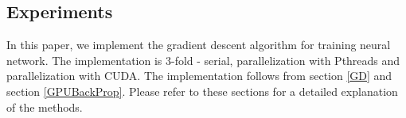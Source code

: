 \subsection{Experiments}
\label{sub:exp}
In this paper, we implement the gradient descent algorithm for training neural network. The implementation is 3-fold - serial, parallelization with Pthreads and parallelization with CUDA. The implementation follows from section \ref{GD} and section \ref{GPUBackProp}. Please refer to these sections for a detailed explanation of the methods.


